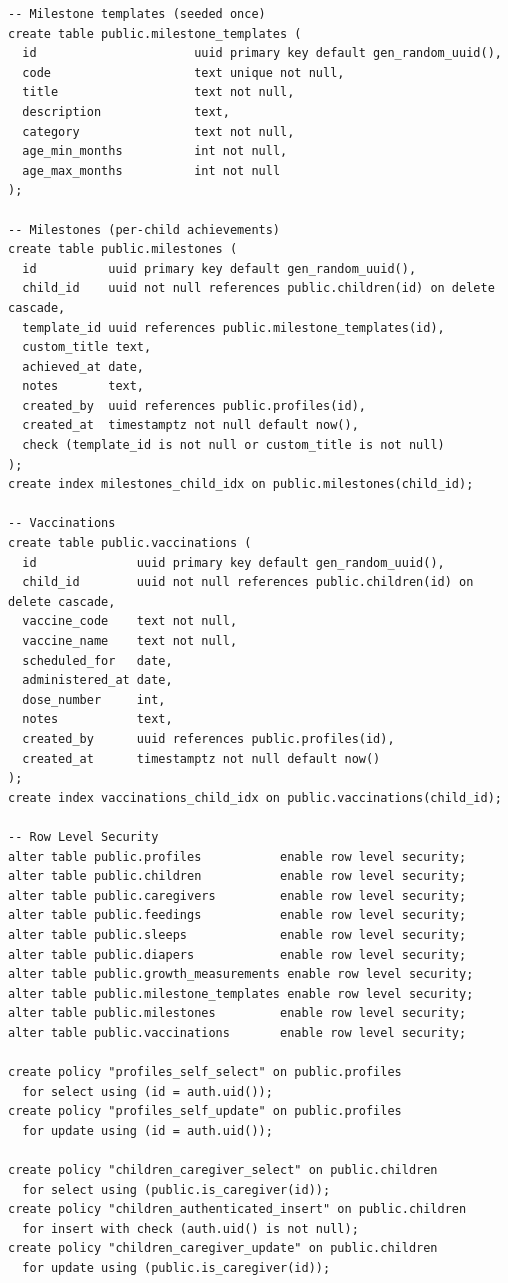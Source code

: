\documentclass[%
  ukrainian, utf8, columnvii, simple,
  hpadding=10mm, vpadding=10mm, reduceheight=2mm,
  floatsection,
]{eskdtext}
\begin{document}
{\begin{verbatim}
-- Milestone templates (seeded once)
create table public.milestone_templates (
  id                      uuid primary key default gen_random_uuid(),
  code                    text unique not null,
  title                   text not null,
  description             text,
  category                text not null,
  age_min_months          int not null,
  age_max_months          int not null
);

-- Milestones (per-child achievements)
create table public.milestones (
  id          uuid primary key default gen_random_uuid(),
  child_id    uuid not null references public.children(id) on delete cascade,
  template_id uuid references public.milestone_templates(id),
  custom_title text,
  achieved_at date,
  notes       text,
  created_by  uuid references public.profiles(id),
  created_at  timestamptz not null default now(),
  check (template_id is not null or custom_title is not null)
);
create index milestones_child_idx on public.milestones(child_id);

-- Vaccinations
create table public.vaccinations (
  id              uuid primary key default gen_random_uuid(),
  child_id        uuid not null references public.children(id) on delete cascade,
  vaccine_code    text not null,
  vaccine_name    text not null,
  scheduled_for   date,
  administered_at date,
  dose_number     int,
  notes           text,
  created_by      uuid references public.profiles(id),
  created_at      timestamptz not null default now()
);
create index vaccinations_child_idx on public.vaccinations(child_id);

-- Row Level Security
alter table public.profiles           enable row level security;
alter table public.children           enable row level security;
alter table public.caregivers         enable row level security;
alter table public.feedings           enable row level security;
alter table public.sleeps             enable row level security;
alter table public.diapers            enable row level security;
alter table public.growth_measurements enable row level security;
alter table public.milestone_templates enable row level security;
alter table public.milestones         enable row level security;
alter table public.vaccinations       enable row level security;

create policy "profiles_self_select" on public.profiles
  for select using (id = auth.uid());
create policy "profiles_self_update" on public.profiles
  for update using (id = auth.uid());

create policy "children_caregiver_select" on public.children
  for select using (public.is_caregiver(id));
create policy "children_authenticated_insert" on public.children
  for insert with check (auth.uid() is not null);
create policy "children_caregiver_update" on public.children
  for update using (public.is_caregiver(id));


\end{verbatim}}
\end{document}
